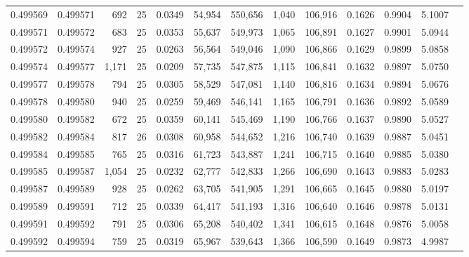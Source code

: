 \begin{tabular}{rrrrrrrrrrrrr}
0.499569 & 0.499571 &   692 &  25 &                                     0.0349 &  54,954 & 550,656 &   1,040 & 106,916 & 0.1626 & 0.9904 & 5.1007 \\
0.499571 & 0.499572 &   683 &  25 &                                     0.0353 &  55,637 & 549,973 &   1,065 & 106,891 & 0.1627 & 0.9901 & 5.0944 \\
0.499572 & 0.499574 &   927 &  25 &                                     0.0263 &  56,564 & 549,046 &   1,090 & 106,866 & 0.1629 & 0.9899 & 5.0858 \\
0.499574 & 0.499577 & 1,171 &  25 &                                     0.0209 &  57,735 & 547,875 &   1,115 & 106,841 & 0.1632 & 0.9897 & 5.0750 \\
0.499577 & 0.499578 &   794 &  25 &                                     0.0305 &  58,529 & 547,081 &   1,140 & 106,816 & 0.1634 & 0.9894 & 5.0676 \\
0.499578 & 0.499580 &   940 &  25 &                                     0.0259 &  59,469 & 546,141 &   1,165 & 106,791 & 0.1636 & 0.9892 & 5.0589 \\
0.499580 & 0.499582 &   672 &  25 &                                     0.0359 &  60,141 & 545,469 &   1,190 & 106,766 & 0.1637 & 0.9890 & 5.0527 \\
0.499582 & 0.499584 &   817 &  26 &                                     0.0308 &  60,958 & 544,652 &   1,216 & 106,740 & 0.1639 & 0.9887 & 5.0451 \\
0.499584 & 0.499585 &   765 &  25 &                                     0.0316 &  61,723 & 543,887 &   1,241 & 106,715 & 0.1640 & 0.9885 & 5.0380 \\
0.499585 & 0.499587 & 1,054 &  25 &                                     0.0232 &  62,777 & 542,833 &   1,266 & 106,690 & 0.1643 & 0.9883 & 5.0283 \\
0.499587 & 0.499589 &   928 &  25 &                                     0.0262 &  63,705 & 541,905 &   1,291 & 106,665 & 0.1645 & 0.9880 & 5.0197 \\
0.499589 & 0.499591 &   712 &  25 &                                     0.0339 &  64,417 & 541,193 &   1,316 & 106,640 & 0.1646 & 0.9878 & 5.0131 \\
0.499591 & 0.499592 &   791 &  25 &                                     0.0306 &  65,208 & 540,402 &   1,341 & 106,615 & 0.1648 & 0.9876 & 5.0058 \\
0.499592 & 0.499594 &   759 &  25 &                                     0.0319 &  65,967 & 539,643 &   1,366 & 106,590 & 0.1649 & 0.9873 & 4.9987 \\

\end{tabular}
